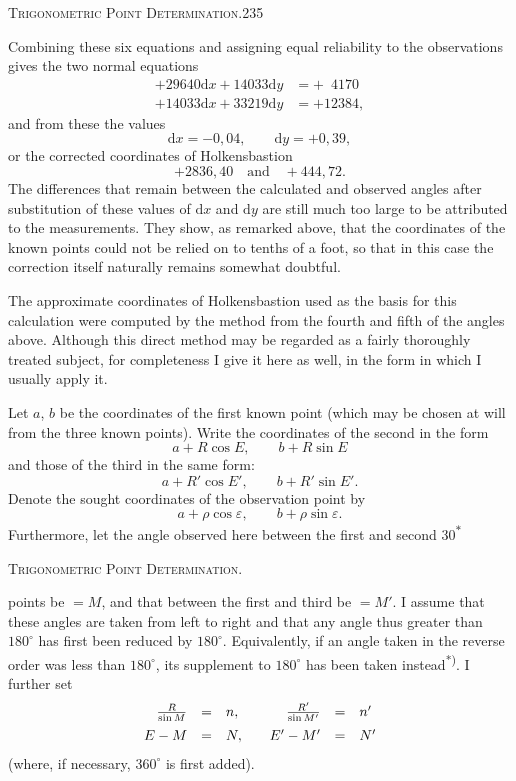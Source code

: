 \clearpage
\noindent\mbox{}\hfill\textsc{Trigonometric Point Determination.}\hfill235\par\medskip
Combining these six equations and assigning equal reliability to the observations gives the two normal equations
\[
\begin{aligned}
+29640\mathrm dx+14033\mathrm dy&=+\phantom04170\\
+14033\mathrm dx+33219\mathrm dy&=+12384,
\end{aligned}
\]
and from these the values
\[
\mathrm dx=-0{,}04,\qquad\mathrm dy=+0{,}39,
\]
or the corrected coordinates of Holkensbastion
\[
+2836{,}40\quad\text{and}\quad+444{,}72.
\]
The differences that remain between the calculated and observed angles after substitution of these values of $\mathrm dx$ and $\mathrm dy$ are still much too large to be attributed to the measurements. They show, as remarked above, that the coordinates of the known points could not be relied on to tenths of a foot, so that in this case the correction itself naturally remains somewhat doubtful.

The approximate coordinates of Holkensbastion used as the basis for this calculation were computed by the  method from the fourth and fifth of the angles above. Although this direct method may be regarded as a fairly thoroughly treated subject, for completeness I give it here as well, in the form in which I usually apply it.

Let $a$, $b$ be the coordinates of the first known point (which may be chosen at will from the three known points). Write the coordinates of the second in the form
\[
a+R\cos E,\qquad b+R\sin E
\]
and those of the third in the same form:
\[
a+R'\cos E',\qquad b+R'\sin E'.
\]
Denote the sought coordinates of the observation point by
\[
a+\rho\cos\varepsilon,\qquad b+\rho\sin\varepsilon.
\]
Furthermore, let the angle observed here between the first and second
\vfill\noindent\hfill30\textsuperscript{$\ast$}\hspace*{2cm}

\clearpage
{}\hfill\textsc{Trigonometric Point Determination.}\hfill\mbox{}\par\medskip
\noindent points be $=M$, and that between the first and third be $=M'$. I assume that these angles are taken from left to right and that any angle thus greater than $180^\circ$ has first been reduced by $180^\circ$. Equivalently, if an angle taken in the reverse order was less than $180^\circ$, its supplement to $180^\circ$ has been taken instead\textsuperscript{*)}. I further set
\[
\begin{array}{rcl@{\qquad}rcl}
\frac R{\sin M}&=&n,&\frac{R'}{\sin M'}&=&n'\\[5pt]
E-M&=&N,&E'-M'&=&N'
\end{array}
\]
(where, if necessary, $360^\circ$ is first added).

